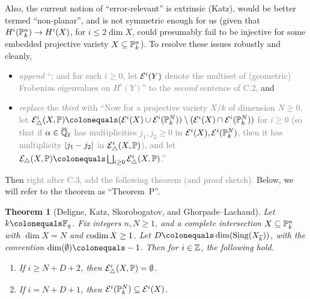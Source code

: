 \documentclass[12pt]{article}
\begin{document}
\begin{itemize}
    Also, the current notion of ``error-relevant'' is extrinsic (Katz),
    would be better termed ``non-planar'',
    and is not symmetric enough for us (given that $H^i(\mathbb{P}^n_k)\to H^i(X)$, for $i\leq 2\dim{X}$, could presumably fail to be injective for some embedded projective variety $X\subseteq \mathbb{P}^n_k$).
    To resolve these issues robustly and cleanly,
    \begin{itemize}
        \item \textcolor{gray}{\emph{append} ``; and for each $i\geq 0$, let $\mathcal{E}^i(Y)$ denote the multiset of (geometric) Frobenius eigenvalues on $H^i(Y)$'' to the \emph{second} sentence of C.2,}
        and
        \item \textcolor{gray}{\emph{replace} the \emph{third} with
        ``Now for a projective variety $X/k$ of dimension $N\geq 0$,
        let $\mcal{E}^i_{\triangle}(X,\PP)\defeq (\mcal{E}^i(X)\cup \mcal{E}^i(\PP^N_k))\setminus (\mcal{E}^i(X)\cap \mcal{E}^i(\PP^N_k))$ for $i\geq 0$
        (so that if $\alpha\in \overline{\mathbb{Q}}_\ell$ has multiplicities $j_1,j_2\geq 0$ in $\mathcal{E}^i(X),\mathcal{E}^i(\mathbb{P}^N_k)$, then it has multiplicity $\lvert j_1-j_2 \rvert$ in $\mathcal{E}^i_{\triangle}(X,\mathbb{P})$),
        and let $\mcal{E}_{\triangle}(X,\PP)\defeq \bigsqcup_{i\geq 0}\mcal{E}^i_{\triangle}(X,\PP)$.''}
    \end{itemize}
    Then \textcolor{gray}{right after C.3, add the following theorem (and proof sketch).}
    Below, we will refer to the theorem as ``Theorem~P''.
    \theoremstyle{plain}
    \newtheorem*{theorem*}{Theorem}
    \begin{theorem*}
    [Deligne, Katz, Skorobogatov, and Ghorpade--Lachaud]
    \label{THM:general-perversity-result}
    Let $k\defeq \FF_q$.
    Fix integers $n,N\geq 1$,
    and a complete intersection $X\subseteq \mathbb{P}^n_k$ with $\dim{X} = N$ and $\operatorname{codim}{X}\geq 1$.
    Let $D\defeq \dim(\map{Sing}(X_{\ol{k}}))$, with the convention $\dim(\emptyset)\defeq -1$.
    Then for $i\in \mathbb{Z}$, the following hold.
    \begin{enumerate}
        \item If $i\geq N+D+2$, then $\mathcal{E}^i_{\triangle}(X,\mathbb{P}) = \emptyset$.
        
        \item If $i = N+D+1$, then $\mathcal{E}^i(\mathbb{P}^{N}_k)\subseteq \mathcal{E}^i(X)$.
    \end{enumerate}
    \end{theorem*}
    
    

\end{itemize}
\end{document}
